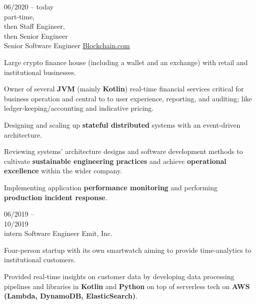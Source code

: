 \begin{entrylist}
    \entry
    {
        06/2020 -- today\\\footnotesize{part-time,\\ then Staff Engineer,\\ then Senior Engineer}\\
    }
    {Senior Software Engineer}
    {\href{https://blockchain.com/about}{Blockchain.com}}
    {
        Large crypto finance house (including a wallet and an exchange) with retail and
    institutional businesses.

    \para
    Owner of several \textbf{JVM} (mainly \textbf{Kotlin}) real-time financial services critical for business operation and central to
    to user experience, reporting, and auditing; like ledger-keeping/accounting and indicative pricing.

    \para
    Designing and scaling up \textbf{stateful distributed} systems with an event-driven architecture.

    \para
    Reviewing systems' architecture designs and software development methods to cultivate \textbf{sustainable engineering practices}
    and achieve \textbf{operational excellence} within the wider company.

    \para
    Implementing application \textbf{performance monitoring} and performing \textbf{production incident response}.


    }
    \entry
    {06/2019 -- \\ 10/2019\\\footnotesize{intern}}
    {Software Engineer}
    {Emit, Inc.}
    {
        Four-person startup with its own smartwatch aiming to provide time-analytics to
        institutional customers.

        \para
        Provided real-time insights on customer data by developing data processing pipelines and libraries in
    \textbf{Kotlin} and \textbf{Python} on top of serverless tech on \textbf{AWS (Lambda,
        DynamoDB, ElasticSearch)}.
    }
\end{entrylist}
